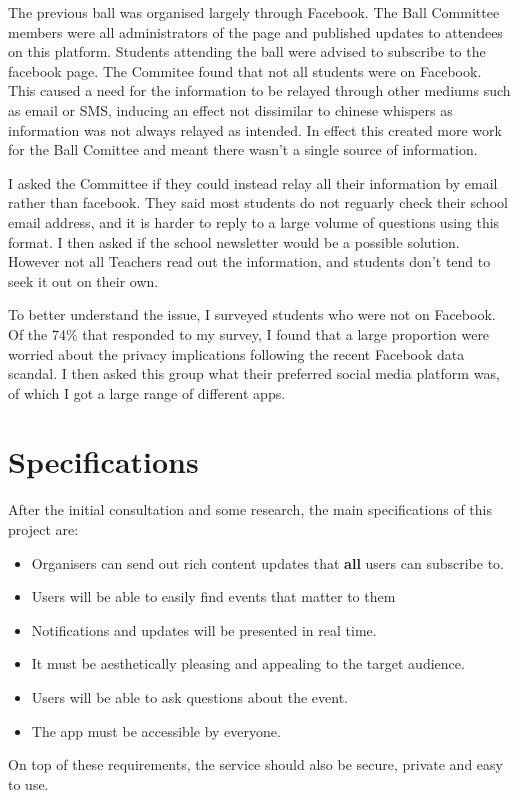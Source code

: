 \documentclass[a4paper,oneside,12pt]{report}
\begin{document}
	The previous ball was organised largely through Facebook. The Ball Committee members were all administrators of the page and published updates to attendees on this platform. Students attending the ball were advised to subscribe to the facebook page. The Commitee found that not all students were on Facebook. This caused a need for the information to be relayed through other mediums such as email or SMS, inducing an effect not dissimilar to chinese whispers as information was not always relayed as intended. In effect this created more work for the Ball Comittee and meant there wasn't a single source of information.

	I asked the Committee if they could instead relay all their information by email rather than facebook. They said most students do not reguarly check their school email address, and it is harder to reply to a large volume of questions using this format. I then asked if the school newsletter would be a possible solution. However not all Teachers read out the information, and students don't tend to seek it out on their own.

	To better understand the issue, I surveyed students who were not on Facebook. Of the 74\% that responded to my survey, I found that a large proportion were worried about the privacy implications following the recent Facebook data scandal. I then asked this group what their preferred social media platform was, of which I got a large range of different apps.

	\section{Specifications}
	After the initial consultation and some research, the main specifications of this project are:
	\begin{itemize}
		\item Organisers can send out rich content updates that \textbf{all} users can subscribe to.
		\item Users will be able to easily find events that matter to them
		\item Notifications and updates will be presented in real time.
		\item It must be aesthetically pleasing and appealing to the target audience.
		\item Users will be able to ask questions about the event.
		\item The app must be accessible by everyone.
	\end{itemize}
	On top of these requirements, the service should also be secure, private and easy to use.
\end{document}
